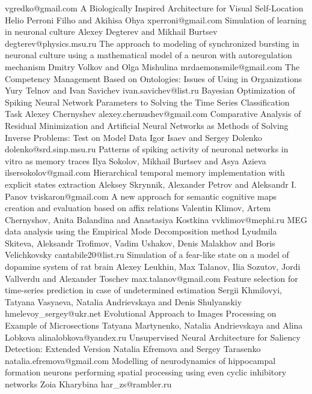 \documentclass[10pt,fleqn,openany]{book} %
\begin{document}
\begin{enumerate}
		{vgredko@gmail.com}
	\poster
		{A Biologically Inspired Architecture for Visual Self-Location}
		{Helio Perroni Filho and Akihisa Ohya}
		{xperroni@gmail.com}
	\poster
		{Simulation of learning in neuronal culture}
		{Alexey Degterev and Mikhail Burtsev}
		{degterev@physics.msu.ru}
	\poster
		{The approach to modeling of synchronized bursting in neuronal culture using a mathematical model of a neuron with autoregulation mechanism}
		{Dmitry Volkov and Olga Mishulina}
		{mrdaemonsmile@gmail.com}
	\poster
		{The Competency Management Based on Ontologies:  Issues of Using in Organizations}
		{Yury Telnov and Ivan Savichev}
		{ivan.savichev@list.ru}
	\poster
		{Bayesian Optimization of Spiking Neural Network Parameters to Solving the Time Series Classification Task}
		{Alexey Chernyshev}
		{alexey.chernushev@gmail.com}
	\poster
		{Comparative Analysis of Residual Minimization and Artificial Neural Networks as Methods of  Solving Inverse Problems: Test on Model Data}
		{Igor Isaev and Sergey Dolenko}
		{dolenko@srd.sinp.msu.ru}
	\poster
		{Patterns of spiking activity of neuronal networks in vitro as memory traces}
		{Ilya Sokolov, Mikhail Burtsev and Asya Azieva}
		{ilsersokolov@gmail.com}
	\poster
		{Hierarchical temporal memory implementation with explicit states extraction}
		{Aleksey Skrynnik, Alexander Petrov and Aleksandr I. Panov}
		{tviskaron@gmail.com}
	\poster
		{A new approach for semantic cognitive maps creation and evaluation based on affix relations}
		{Valentin Klimov, Artem Chernyshov, Anita Balandina and Anastasiya Kostkina}
		{vvklimov@mephi.ru}
	\poster
		{MEG data analysis using the Empirical Mode Decomposition method}
		{Lyudmila Skiteva, Aleksandr Trofimov, Vadim Ushakov, Denis Malakhov and Boris Velichkovsky}
		{cantabile20@list.ru}
	\poster
		{Simulation of a fear-like state on a model of dopamine system of rat brain}
		{Alexey Leukhin, Max Talanov, Ilia Sozutov, Jordi Vallverdu and Alexander Toschev}
		{max.talanov@gmail.com}
	\poster
		{Feature selection for time-series prediction in case of undetermined estimation}
		{Sergii Khmilovyi, Tatyana Vasyaeva, Natalia Andrievskaya and Denis Shulyanskiy}
		{hmelevoy\_sergey@ukr.net}
	\poster
		{Evolutional Approach to Images Processing  on Example of Microsections}
		{Tatyana Martynenko, Natalia Andrievskaya and Alina Lobkova}
		{alinalobkova@yandex.ru}
	\poster
		{Unsupervised Neural Architecture for Saliency Detection: Extended Version}
		{Natalia Efremova and Sergey Tarasenko}
		{natalia.efremova@gmail.com}
	\poster
		{Modelling of neurodynamics of hippocampal formation neurons performing spatial processing using even cyclic inhibitory networks}
		{Zoia Kharybina}
		{har\_zs@rambler.ru}
		
\end{enumerate}
\end{document}
